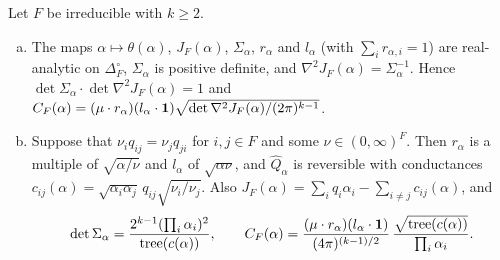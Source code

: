 \begin{proposition}\label{prop:constant}
Let $F$ be irreducible with $k\ge2$.
\begin{enumerate}[(a)]
\item The maps $\alpha\mapsto\theta(\alpha)$, $J_F(\alpha)$, $\Sigma_\alpha$,
$r_\alpha$ and $l_\alpha$ (with $\sum_ir_{\alpha,i}=1$) are real-analytic on
$\Delta_F^\circ$, $\Sigma_\alpha$ is positive definite, and
$\nabla^2J_F(\alpha)=\Sigma_\alpha^{-1}$. Hence
$\det\Sigma_\alpha\cdot\det\nabla^2J_F(\alpha)=1$ and
$C_F(\alpha)=(\mu\cdot r_\alpha)(l_\alpha\cdot\mathbf{1})
\sqrt{\det\nabla^2J_F(\alpha)/(2\pi)^{k-1}}$.
\item Suppose that $\nu_iq_{ij}=\nu_jq_{ji}$ for $i,j\in F$ and some
$\nu\in(0,\infty)^F$. Then $r_\alpha$ is a multiple of $\sqrt{\alpha/\nu}$
and $l_\alpha$ of $\sqrt{\alpha\nu}$, and $\widehat Q_\alpha$ is reversible
with conductances $c_{ij}(\alpha)=\sqrt{\alpha_i\alpha_j}\,q_{ij}\sqrt{\nu_i/\nu_j}$.
Also $J_F(\alpha)=\sum_iq_i\alpha_i-\sum_{i\ne j}c_{ij}(\alpha)$, and
\[
\det\Sigma_\alpha=\frac{2^{k-1}(\prod_i\alpha_i)^2}{\operatorname{tree}(c(\alpha))},\qquad
C_F(\alpha)=\frac{(\mu\cdot r_\alpha)(l_\alpha\cdot\mathbf{1})}{(4\pi)^{(k-1)/2}}
\,\frac{\sqrt{\operatorname{tree}(c(\alpha))}}{\prod_i\alpha_i}.
\]
\end{enumerate}
\end{proposition}


